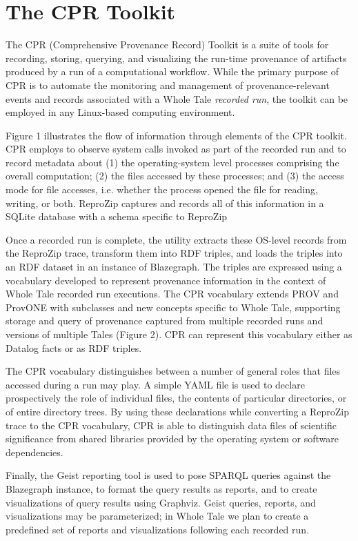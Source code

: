 \section{The CPR Toolkit}

The CPR (Comprehensive Provenance Record) Toolkit is a suite of tools for recording, storing, querying, and visualizing the run-time provenance of artifacts produced by a run of a computational workflow. While the primary purpose of CPR  is to automate the monitoring and management of provenance-relevant events and records associated with a Whole Tale \emph{recorded run}, the toolkit can be employed in any Linux-based computing environment.

Figure 1 illustrates the flow of information through elements of the CPR toolkit. CPR employs  to observe system calls invoked as part of the recorded run and to record metadata about (1) the operating-system level processes comprising the overall computation; (2) the files accessed by these processes; and (3) the access mode for file accesses, i.e. whether the process opened the file for reading, writing, or both. ReproZip captures and records all of this information in a SQLite database with a schema specific to ReproZip

Once a recorded run is complete, the  utility extracts these OS-level records from the ReproZip trace, transform them into RDF triples, and loads the triples into an RDF dataset in an instance of Blazegraph. The triples are expressed using a vocabulary developed to represent provenance information in the context of Whole Tale recorded run executions. The CPR vocabulary extends PROV and ProvONE with subclasses and new concepts specific to Whole Tale, supporting storage and query of provenance captured from multiple recorded runs and versions of multiple Tales (Figure 2). CPR can represent this vocabulary either as Datalog facts or as RDF triples.

The CPR vocabulary distinguishes between a number of general roles that files accessed during a run may play. A simple YAML file is used to declare prospectively the role of individual files, the contents of particular directories, or of entire directory trees. By using these declarations while converting a ReproZip trace to the CPR vocabulary, CPR is able to distinguish data files of scientific significance from shared libraries provided by the operating system or software dependencies.

Finally, the Geist reporting tool is used to pose SPARQL queries against the Blazegraph instance, to format the query results as reports, and to create visualizations of query results using Graphviz.  Geist queries, reports, and visualizations may be parameterized; in Whole Tale we plan to create a predefined set of reports and visualizations following each recorded run.

%
